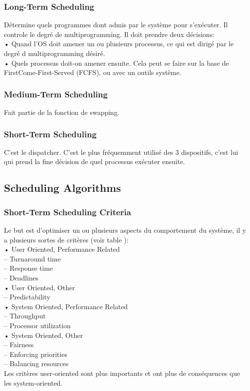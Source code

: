 \subsubsection{Long-Term Scheduling}
Détermine quels programmes dont admis par le système pour s'exécuter.
Il controle le degré de multiprogramming.
Il doit prendre deux décisions: \\
• Quand l'OS doit amener un ou plusieurs processus, ce qui est dirigé par le degré d multiprogramming désiré.\\
• Quels processus doit-on amener ensuite.
Cela peut se faire sur la base de FirstCome-First-Served (FCFS), ou avec un outils système.
\subsubsection{Medium-Term Scheduling}
Fait partie de la fonction de swapping.
\subsubsection{Short-Term Scheduling}
C'est le dispatcher.
C'est le plus fréquemment utilisé des 3 dispositifs, c'est lui qui prend la fine décision de quel processus exécuter ensuite.
\subsection{Scheduling Algorithms }
\subsubsection{Short-Term Scheduling Criteria}
Le but est d'optimiser un ou plusieurs aspects du comportement du système, il y a plusieurs sortes de critères (voir table \cite[p.~401]{stallings}):\\
• User Oriented, Performance Related\\
– Turnaround time \\
– Response time\\
– Deadlines\\
• User Oriented, Other \\
– Predictability \\
• System Oriented, Performance Related \\
– Throughput\\
– Processor utilization \\
• System Oriented, Other\\
– Fairness\\
– Enforcing priorities \\
– Balancing resources\\
Les critères user-oriented sont plus importants et ont plus de conséquences que les system-oriented.

